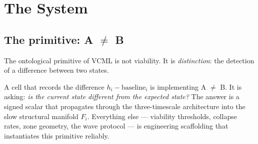 \documentclass[11pt]{article}
\begin{document}
\begin{abstract}
ablation-influence partial correlations in GPT-2 flip sign at layer~4 from positive
(feature construction) to negative (causal integration, peak $r_p = -0.337$,
$p \ll 0.001$), with random-token control tracking ablation at every layer,
confirming that transformer geometry is organised by causal routing structure.
Paper~46 closes the temporal gate invariant and validates $\Omega = \mathrm{WR}\times\phi_w$
as the operative $C_2$ coordinate.
Paper~47 confirms $\delta = W_\mathrm{zone}/r_\mathrm{wave}$ as the third $C_2$ coordinate
(encoding quality peaks at $\delta=5$, degrades at $\delta \leq 2.5$) and reveals that
gate selectivity controls \emph{commitment rate} as well as adversarial filtering ---
the same mechanism at the same timescale.
Paper~48 establishes that VCML builds a \emph{population code}: single-cell zone decode
accuracy is only 4--5\% above chance across all gate conditions; zone information lives
in zone means, not individual cells.
The quiescence gate's operative function is noise reduction ($\sigma_w$ halves at high SS),
not amplitude enhancement; the true causal quality measure is
$\mathrm{SNR} = \mathrm{sg4}/\sigma_w$, which correctly ranks gate conditions.
The primitive underlying the entire architecture is A $\neq$ B (distinction detection);
viable/non-viable is one engineering instantiation.
The viability boundary is the maximum-information, maximum-distinction site in the
substrate; zone structure is the accumulated geometry of boundary crossings.
\end{abstract}

\section{The System}

\subsection{The primitive: A $\neq$ B}

The ontological primitive of VCML is not viability.
It is \emph{distinction}: the detection of a difference between two states.

A cell that records the difference $h_i - \mathrm{baseline}_i$ is implementing A $\neq$ B.
It is asking: \emph{is the current state different from the expected state?}
The answer is a signed scalar that propagates through the three-timescale architecture
into the slow structural manifold $F_i$.
Everything else --- viability thresholds, collapse rates, zone geometry, the wave protocol ---
is engineering scaffolding that instantiates this primitive reliably.
\end{document}
